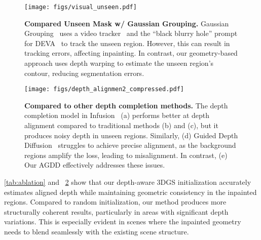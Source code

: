 \begin{figure}[t]
    \centering
    \texttt{[image: figs/visual\_unseen.pdf]}
    \vspace{-6mm}
    \caption{
    \textbf{Compared Unseen Mask w/ Gaussian Grouping.} 
    Gaussian Grouping~\cite{ye2023gaussian} uses a video tracker~\cite{cheng2023tracking} and the ``black blurry hole'' prompt for DEVA~\cite{cheng2023tracking} to track the unseen region. However, this can result in tracking errors, affecting inpainting. In contrast, our geometry-based approach uses depth warping to estimate the unseen region's contour, reducing segmentation errors.
    } %
    \label{fig:visual_unseen}
\end{figure}

\begin{figure}[t]
    \centering
    \texttt{[image: figs/depth\_alignmen2\_compressed.pdf]}
    \vspace{-6mm}
    \caption{\textbf{Compared to other depth completion methods.} The depth completion model in Infusion~\cite{liu2024infusion} (a) performs better at depth alignment compared to traditional methods (b) and (c), but it produces noisy depth in unseen regions. Similarly, (d) Guided Depth Diffusion~\cite{yu2024wonderworld} struggles to achieve precise alignment, as the background regions amplify the loss, leading to misalignment. In contrast, (e) Our AGDD effectively addresses these issues.} %
    \label{fig:ablation_depth_alignment2}
\end{figure}



\vspace{3pt}
\cref{tab:ablation} and ~\cref{fig:ablation_depth_alignment2} show that our depth-aware 3DGS initialization accurately estimates aligned depth while maintaining geometric consistency in the inpainted regions. Compared to random initialization, our method produces more structurally coherent results, particularly in areas with significant depth variations. This is especially evident in scenes where the inpainted geometry needs to blend seamlessly with the existing scene structure.



